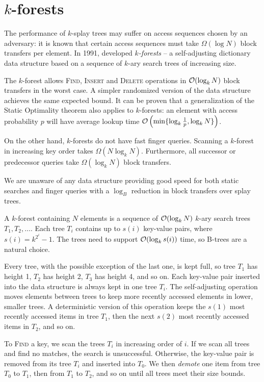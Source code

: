 \chapter{$k$-forests}
\label{chapter:kforest}
The performance of $k$-splay trees may suffer on access sequences chosen
by an adversary: it is known that certain access sequences must
take $\Omega(\log N)$ block transfers per element.
In 1991, \cite{martel} developed \emph{$k$-forests} --
a self-adjusting dictionary data structure based on a sequence of
$k$-ary search trees of increasing size.

The $k$-forest allows \textsc{Find}, \textsc{Insert} and \textsc{Delete}
operations in $\mathcal{O}(\log_k N)$ block transfers in the worst case. A simpler
randomized version of the data structure achieves the same expected bound.
It can be proven that a generalization of the Static Optimality theorem
also applies to $k$-forests: an element with access probability $p$
will have average lookup time $\mathcal{O}\left(\min\{\log_k \frac{1}{p}, \log_k
N\}\right)$.


On the other hand, $k$-forests do not have fast finger queries. Scanning
a $k$-forest in increasing key order takes $\Omega(N\log_k N)$. Furthermore,
all successor or predecessor queries take $\Omega(\log_k N)$ block transfers.

We are unaware of any data structure providing good speed for both static
searches and finger queries with a $\log_B$ reduction in block transfers
over splay trees.

A $k$-forest containing $N$ elements is a sequence of $\mathcal{O}(\log_k N)$ $k$-ary
search trees $T_1, T_2, \ldots$. Each tree $T_i$ contains up to $s(i)$ key-value
pairs, where $s(i) = k^{2^i} - 1$. The trees need to support $\mathcal{O}(\log_k s(i))$
time, so B-trees are a natural choice.

Every tree, with the possible exception of the last one, is kept full,
so tree $T_1$ has height 1, $T_2$ has height 2, $T_3$ has height 4, and so on.
Each key-value pair inserted into the data structure is always kept in one
tree $T_i$. The self-adjusting operation moves elements between trees to
keep more recently accessed elements in lower, smaller trees.
A deterministic version of this operation keeps the $s(1)$ most recently
accessed items in tree $T_1$, then the next $s(2)$ most recently accessed
items in $T_2$, and so on.

To \textsc{Find} a key, we scan the trees $T_i$ in increasing order of $i$.
If we scan all trees and find no matches, the search is unsuccessful.
Otherwise, the key-value pair is removed from its tree $T_i$ and inserted
into $T_0$. We then \emph{demote} one item from tree $T_0$ to $T_1$,
then from $T_1$ to $T_2$, and so on until all trees meet their size bounds.

